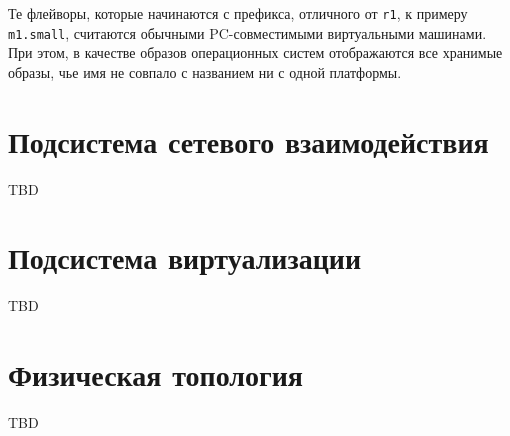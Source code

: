Те флейворы, которые начинаются с префикса, отличного от \verb`r1`, к примеру
\verb`m1.small`, считаются обычными PC-совместимыми виртуальными машинами. 
При этом, в качестве образов операционных систем отображаются все хранимые образы, 
чье имя не совпало с названием ни с одной платформы.

\section{Подсистема сетевого взаимодействия}
TBD

\section{Подсистема виртуализации}
TBD

\section{Физическая топология}
TBD


